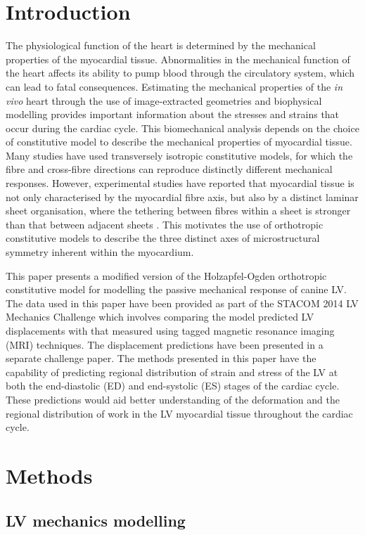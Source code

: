 \documentclass{llncs}
\begin{document}
\section{Introduction}
The physiological function of the heart is determined by the mechanical properties of the myocardial tissue. Abnormalities in the mechanical function of the heart affects its ability to pump blood through the circulatory system, which can lead to fatal consequences. Estimating the mechanical properties of the {\itshape in vivo} heart through the use of image-extracted geometries and biophysical modelling provides important information about the stresses and strains that occur during the cardiac cycle. This biomechanical analysis depends on the choice of constitutive model to describe the mechanical properties of myocardial tissue. Many studies have used transversely isotropic constitutive models, for which the fibre and cross-fibre directions can reproduce distinctly different mechanical responses. However, experimental studies have reported that myocardial tissue is not only characterised by the myocardial fibre axis, but also by a distinct laminar sheet organisation, where the tethering between fibres within a sheet is stronger than that between adjacent sheets \cite{LeGrice}. This motivates the use of orthotropic constitutive models to describe the three distinct axes of microstructural symmetry inherent within the myocardium. 

This paper presents a modified version of the Holzapfel-Ogden orthotropic constitutive model \cite{Holz} for modelling the passive mechanical response of canine LV. The data used in this paper have been provided as part of the STACOM 2014 LV Mechanics Challenge which involves comparing the model predicted LV displacements with that measured using tagged magnetic resonance imaging (MRI) techniques. The displacement predictions have been presented in a separate challenge paper. The methods presented in this paper have the capability of predicting regional distribution of strain and stress of the LV at both the end-diastolic (ED) and end-systolic (ES) stages of the cardiac cycle. These predictions would aid better understanding of the deformation and the regional distribution of work in the LV myocardial tissue throughout the cardiac cycle. 

\section{Methods}
\subsection{LV mechanics modelling}
\end{document}
